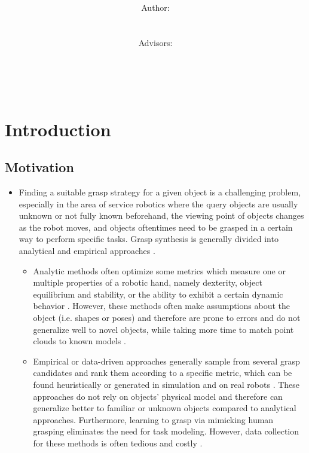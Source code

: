 \documentclass[12pt]{article}
\title{\normalsize \textsc{\hmwkAuthorSchool}   %
    \\[2.0cm]                                   %
    \HRule{0.5pt} \\                            %
    \LARGE \textbf{\uppercase{\hmwkTopic}}
    \HRule{2pt} \\ [0.5cm]                      %
    \hmwkTitle\\[0.5cm]
    \normalsize \hmwkDueDate\\
}
\author{
    \\[4.0cm]
    Author:\\
    \hmwkAuthorName\\
    \ \\
    Advisors:\\
    \hmwkAdvisorFirst\\
    \hmwkAdvisorSecond\\
    \hmwkAdvisorThird\\
}
\date{}
\begin{document}
    \maketitle
    \thispagestyle{firststyle}
    \newpage

\section{Introduction}

    \subsection{Motivation}
    \begin{itemize}
        \item Finding a suitable grasp strategy for a given object is a challenging problem, especially in the area of service robotics where the query objects are usually unknown or not fully known beforehand, the viewing point of objects changes as the robot moves, and objects oftentimes need to be grasped in a certain way to perform specific tasks. Grasp synthesis is generally divided into analytical and empirical approaches \cite{Bohg2014,Sahbani2012}.
        \begin{itemize}
            \item Analytic methods often optimize some metrics which measure one or multiple properties of a robotic hand, namely dexterity, object equilibrium and stability, or the ability to exhibit a certain dynamic behavior \cite{Bohg2014}. However, these methods often make assumptions about the object (i.e. shapes or poses) and therefore are prone to errors and do not generalize well to novel objects, while taking more time to match point clouds to known models \cite{Goldfeder2011}.
            \item Empirical or data-driven approaches generally sample from several grasp candidates and rank them according to a specific metric, which can be found heuristically or generated in simulation and on real robots \cite{Bohg2014}. These approaches do not rely on objects' physical model and therefore can generalize better to familiar or unknown objects compared to analytical approaches. Furthermore, learning to grasp via mimicking human grasping eliminates the need for task modeling. However, data collection for these methods is often tedious and costly \cite{mahler2017}.

\end{itemize}
\end{itemize}
\end{document}

